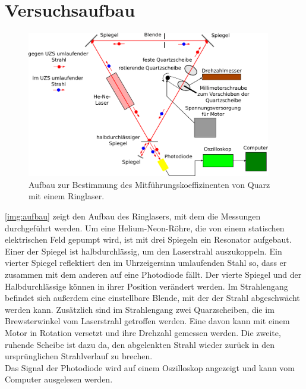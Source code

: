 \section{Versuchsaufbau}

\begin{figure}[H]
\begin{center}
  \includegraphics[width=0.95\textwidth]{../img/aufbau.pdf}
  \caption{Aufbau zur Bestimmung des Mitführungskoeffizinenten von Quarz mit einem Ringlaser.}
  \label{img:aufbau}
\end{center}
\end{figure}
\autoref{img:aufbau} zeigt den Aufbau des Ringlasers,
mit dem die Messungen durchgeführt werden.
Um eine Helium-Neon-Röhre,
die von einem statischen elektrischen Feld gepumpt wird,
ist mit drei Spiegeln ein Resonator aufgebaut.
Einer der Spiegel ist halbdurchlässig, um den Laserstrahl auszukoppeln.
Ein vierter Spiegel reflektiert den im Uhrzeigersinn umlaufenden Stahl so,
dass er zusammen mit dem anderen auf eine Photodiode fällt.
Der vierte Spiegel und der Halbdurchlässige können in ihrer Position verändert werden.
Im Strahlengang befindet sich außerdem eine einstellbare Blende,
mit der der Strahl abgeschwächt werden kann.
Zusätzlich sind im Strahlengang zwei Quarzscheiben,
die im Brewsterwinkel vom Laserstrahl getroffen werden.
Eine davon kann mit einem Motor in Rotation versetzt und ihre Drehzahl gemessen werden.
Die zweite, ruhende Scheibe ist dazu da,
den abgelenkten Strahl wieder zurück in den ursprünglichen Strahlverlauf zu brechen.\\
Das Signal der Photodiode wird auf einem Oszilloskop angezeigt und kann
vom Computer ausgelesen werden.